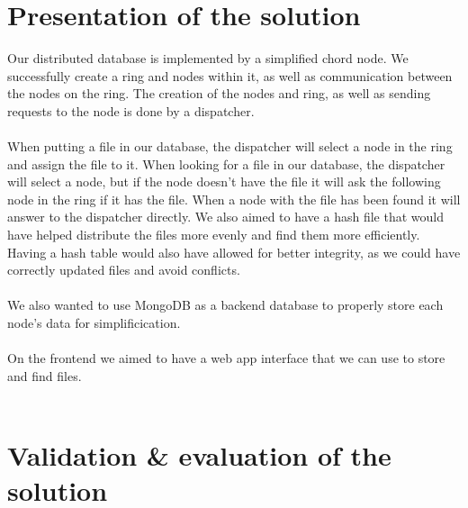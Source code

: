 \documentclass{article}
\begin{document}
\section{Presentation of the solution}
Our distributed database is implemented by a simplified chord node. We successfully create a ring and nodes within it, as well as communication between the nodes on the ring. The creation of the nodes and ring, as well as sending requests to the node is done by a dispatcher.
\\\\
When putting a file in our database, the dispatcher will select a node in the ring and assign the file to it. When looking for a file in our database, the dispatcher will select a node, but if the node doesn't have the file it will ask the following node in the ring if it has the file. When a node with the file has been found it will answer to the dispatcher directly. We also aimed to have a hash file that would have helped distribute the files more evenly and find them more efficiently. Having a hash table would also have allowed for better integrity, as we could have correctly updated files and avoid conflicts.
\\\\
We also wanted to use MongoDB as a backend database to properly store each node's data for simplificication.
\\\\
On the frontend we aimed to have a web app interface that we can use to store and find files.
\\\\

\section{Validation \& evaluation of the solution}
\end{document}
